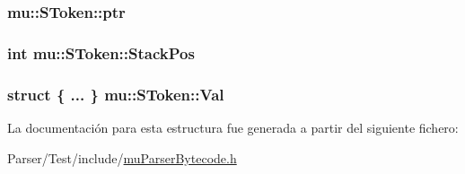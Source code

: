 \subsubsection[{\texorpdfstring{ptr}{ptr}}]{ mu\+::\+S\+Token\+::ptr}\hypertarget{structmu_1_1_s_token_a50235e1e981005a894fdf288657f8949}{}\label{structmu_1_1_s_token_a50235e1e981005a894fdf288657f8949}
\subsubsection[{\texorpdfstring{Stack\+Pos}{StackPos}}]{\setlength{\rightskip}{0pt plus 5cm}int mu\+::\+S\+Token\+::\+Stack\+Pos}\hypertarget{structmu_1_1_s_token_af371dc5e396be91862e1cd4b0a908512}{}\label{structmu_1_1_s_token_af371dc5e396be91862e1cd4b0a908512}
\subsubsection[{\texorpdfstring{Val}{Val}}]{\setlength{\rightskip}{0pt plus 5cm}struct \{ ... \}   mu\+::\+S\+Token\+::\+Val}\hypertarget{structmu_1_1_s_token_a6596797ebf4cedf041fc99316db70f59}{}\label{structmu_1_1_s_token_a6596797ebf4cedf041fc99316db70f59}


La documentación para esta estructura fue generada a partir del siguiente fichero\+:\begin{DoxyCompactItemize}
\item 
Parser/\+Test/include/\hyperlink{mu_parser_bytecode_8h}{mu\+Parser\+Bytecode.\+h}\end{DoxyCompactItemize}
